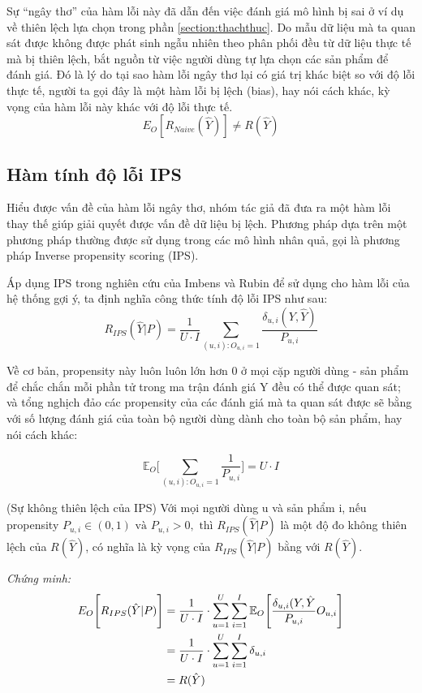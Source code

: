 Sự ``ngây thơ'' của hàm lỗi này đã dẫn đến việc đánh giá mô hình bị sai ở ví dụ về thiên lệch lựa chọn trong phần \ref{section:thachthuc}. Do mẫu dữ liệu mà ta quan sát được không được phát sinh ngẫu nhiên theo phân phối đều từ dữ liệu thực tế mà bị thiên lệch, bắt nguồn từ việc người dùng tự lựa chọn các sản phẩm để đánh giá. Đó là lý do tại sao hàm lỗi ngây thơ lại có giá trị khác biệt so với độ lỗi thực tế, người ta gọi đây là một hàm lỗi bị lệch (bias), hay nói cách khác, kỳ vọng của hàm lỗi này khác với độ lỗi thực tế.
\[E_O [R_{Naive} (\hat{Y})] \ne R(\hat{Y})\]

\subsection{Hàm tính độ lỗi IPS}
Hiểu được vấn đề của hàm lỗi ngây thơ, nhóm tác giả đã đưa ra một hàm lỗi thay thế giúp giải quyết được vấn đề dữ liệu bị lệch. Phương pháp dựa trên một phương pháp thường được sử dụng trong các mô hình nhân quả, gọi là phương pháp Inverse propensity scoring (IPS). 

Áp dụng IPS trong nghiên cứu của Imbens và Rubin \cite{imbens_rubin_2015} để sử dụng cho hàm lỗi của hệ thống gợi ý, ta định nghĩa công thức tính độ lỗi IPS như sau:
\begin{equation}
\label{eq:IPS}
R_{IPS}(\hat{Y}|P) = \frac{1}{U\cdot I}\sum_{(u,i):O_{u,i}=1} \frac{\delta_{u,i}(Y,\hat{Y})}{P_{u,i}}
\end{equation}

Về cơ bản, propensity này luôn luôn lớn hơn 0 ở mọi cặp người dùng - sản phẩm để chắc chắn mỗi phần tử trong ma trận đánh giá Y đều có thể được quan sát; và tổng nghịch đảo các propensity của các đánh giá mà ta quan sát được sẽ bằng với số lượng đánh giá của toàn bộ người dùng dành cho toàn bộ sản phẩm, hay nói cách khác:

\begin{equation}
\label{eq:EO}
\mathbb{E}_{O}\bigg[\sum_{(u,i):O_{u,i}=1} \frac{1}{P_{u,i}}\bigg] = U \cdot I
\end{equation}

\begin{lemma}
(Sự không thiên lệch của IPS)
Với mọi người dùng u và sản phẩm i, nếu propensity $P_{u,i} \in (0,1)\text{ và }  P_{u,i}>0, \text{ thì }  R_{IPS}(\hat{Y}|P)$ là một độ đo không thiên lệch của $R(\hat{Y})$, có nghĩa là kỳ vọng của $R_{IPS}(\hat{Y}|P)$ bằng với $R(\hat{Y})$.
\end{lemma}

\textit{Chứng minh:} 
\begin{equation}
\begin{aligned}
\mathcal\mathbb{E}_{O} \Bigg[R_{IPS}(\hat{Y}|P)\Bigg] &=  \frac{1}{U\cdot I} \cdot \sum_{u=1}^{U} \sum_{i=1}^{I} \mathbb{E}_{O} \Bigg[ \frac{\delta_{u,i}(Y,\hat{Y}}{P_{u,i}}{O_{u,i}}\Bigg] \\ &= \frac{1}{U\cdot I} \cdot \sum_{u=1}^{U} \sum_{i=1}^{I}\delta_{u,i} \\ &
= R(\hat{Y})
\end{aligned}
\end{equation}

